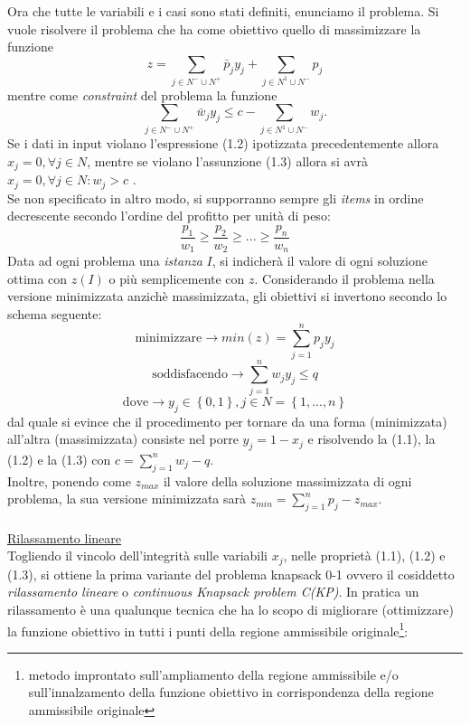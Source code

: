 \documentclass[12pt,a4paper,openright,twoside]{report}
\begin{document}
Ora che tutte le variabili e i casi sono stati definiti, enunciamo il problema. Si vuole risolvere il problema che ha come obiettivo quello di massimizzare la funzione $$z = \sum_{j \in N^{-} \cup N^{+}} \bar{p}_{j} y_{j} + \sum_{j \in N^{1} \cup N^{-}} p_{j}$$
mentre come \textit{constraint} del problema la funzione $$\sum_{j \in N^{-} \cup N^{+}} \bar{w}_{j} y_{j} \leq c - \sum_{j \in N^{1} \cup N^{-}} w_{j}.$$
Se i dati in input violano l'espressione (1.2) ipotizzata precedentemente allora $x_{j} = 0 , \forall j \in N$, mentre se violano l'assunzione (1.3) allora si avr\`{a} $x_{j} = 0 , \forall j \in N : w_{j} > c$ .\\
Se non specificato in altro modo, si supporranno sempre gli \textit{items} in ordine decrescente secondo l'ordine del profitto per unit\`{a} di peso:
$$\dfrac{p_{1}}{w_{1}} \geq \dfrac{p_{2}}{w_{2}} \geq ... \geq \dfrac{p_{n}}{w_{n}} $$
Data ad ogni problema una \textit{istanza} $I$, si indicher\`{a} il valore di ogni soluzione ottima con $z(I)$ o pi\`{u} semplicemente con $z$.
Considerando il problema nella versione minimizzata anzich\`{e} massimizzata, gli obiettivi si invertono secondo lo schema seguente:
$$\mbox{minimizzare} \longrightarrow min(z) = \sum^{n}_{j=1}p_{j}y_{j}$$
$$\mbox{soddisfacendo} \longrightarrow \sum^{n}_{j=1}w_{j}y_{j} \leq q$$
$$\mbox{dove} \longrightarrow y_{j}\in \left\lbrace 0,1\right\rbrace , j \in N =\left\lbrace1,...,n\right\rbrace$$
dal quale si evince che il procedimento per tornare da una forma (minimizzata) all'altra (massimizzata) consiste nel porre $y_{j} = 1 - x_{j}$ e risolvendo la (1.1), la (1.2) e la (1.3) con $c = \sum^{n}_{j=1}w_{j} - q$.\\
Inoltre, ponendo come $z_{max}$ il valore della soluzione massimizzata di ogni problema, la sua versione minimizzata sar\`{a} $z_{min} = \sum^{n}_{j=1}p_{j} - z_{max}$.\\
\\
\underline{Rilassamento lineare}\\
Togliendo il vincolo dell'integrit\`{a} sulle variabili $x_{j}$, nelle propriet\`{a} (1.1), (1.2) e (1.3), si ottiene la prima variante del problema knapsack 0-1 ovvero il cosiddetto \textit{rilassamento lineare} o \textit{continuous Knapsack problem C(KP)}. In pratica un rilassamento \`{e} una qualunque tecnica che ha lo scopo di migliorare (ottimizzare) la funzione obiettivo in tutti i punti della regione ammissibile originale\footnote{metodo improntato sull'ampliamento della regione ammissibile e/o sull'innalzamento della funzione obiettivo in corrispondenza della regione ammissibile originale}: 
\end{document}
